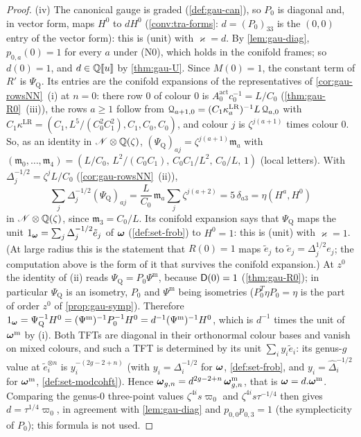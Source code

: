 \begin{proof}
(iv) The canonical gauge is graded (\cref{def:gau-can}), so $P_0$ is diagonal and, in vector form, maps $H^0$ to $dH^0$ (\cref{conv:tra-forms}: $d=(P_0)_{33}$ is the $(0,0)$ entry of the vector form): this is (unit) with $\varkappa=d$. By \cref{lem:gau-diag}, $p_{0,a}(0)=1$ for every $a$ under (N0), which holds in the conifold frames; so $d(0)=1$, and $d\in\mathbb{Q}[\![ u ]\!]$ by \cref{thm:gau-U}. Since $M(0)=1$, the constant term of $R'$ is $\Psi_{\mathrm Q}$. Its entries are the conifold expansions of the representatives of \cref{cor:gau-rowsNN}~(i) at $n=0$: there row $0$ of colour $0$ is $A^{\mathrm{act}}_0c_0^{-1}=L/C_0$ (\cref{thm:gau-R0}~(iii)), the rows $a\geq1$ follow from $\mathcal{Q}_{a+1,0}=(C_1\kappa^{\mathrm{LR}}_a)^{-1}L\,\mathcal{Q}_{a,0}$ with $C_1\kappa^{\mathrm{LR}}=(C_1,L^5/(C_0^2C_1^2),C_1,C_0,C_0)$, and colour $j$ is $\zeta^{j(a+1)}$ times colour $0$. So, as an identity in $\mathscr{N}\otimes\mathbb{Q}(\zeta)$, $(\Psi_{\mathrm Q})_{aj}=\zeta^{j(a+1)}\mathfrak m_a$ with $(\mathfrak m_0,\dots,\mathfrak m_4)=(L/C_0,\,L^2/(C_0C_1),\,C_0C_1/L^2,\,C_0/L,\,1)$ (local letters). With $\Delta_j^{-1/2}=\zeta^jL/C_0$ (\cref{cor:gau-rowsNN}~(ii)),
\[
\textstyle\sum_j\Delta_j^{-1/2}(\Psi_{\mathrm Q})_{aj}=\frac L{C_0}\,\mathfrak m_a\sum_j\zeta^{j(a+2)}=5\,\delta_{a3}=\eta(H^a,H^0)
\]
in $\mathscr{N}\otimes\mathbb{Q}(\zeta)$, since $\mathfrak m_3=C_0/L$. Its conifold expansion says that $\Psi_{\mathrm Q}$ maps the unit $1_{\boldsymbol{\omega}}=\sum_j\Delta_j^{-1/2}\tilde e_j$ of $\boldsymbol{\omega}$ (\cref{def:set-frob}) to $H^0=1$: this is (unit) with $\varkappa=1$. (At large radius this is the statement that $R(0)=1$ maps $\tilde e_j$ to $\tilde e_j=\Delta_j^{1/2}e_j$; the computation above is the form of it that survives the conifold expansion.) At $z^0$ the identity of (ii) reads $\Psi_{\mathrm Q}=P_0\Psi^{\mathrm m}$, because $\mathsf{D}(0)=1$ (\cref{thm:gau-R0}); in particular $\Psi_{\mathrm Q}$ is an isometry, $P_0$ and $\Psi^{\mathrm m}$ being isometries ($P_0^T\eta P_0=\eta$ is the part of order $z^0$ of \cref{prop:gau-symp}). Therefore $1_{\boldsymbol{\omega}}=\Psi_{\mathrm Q}^{-1}H^0=(\Psi^{\mathrm m})^{-1}P_0^{-1}H^0=d^{-1}(\Psi^{\mathrm m})^{-1}H^0$, which is $d^{-1}$ times the unit of $\boldsymbol{\omega}^{\mathrm m}$ by (i). Both TFTs are diagonal in their orthonormal colour bases and vanish on mixed colours, and such a TFT is determined by its unit $\sum_iy_i\tilde e_i$: its genus-$g$ value at $\tilde e_i^{\otimes n}$ is $y_i^{-(2g-2+n)}$ (with $y_i=\Delta_i^{-1/2}$ for $\boldsymbol{\omega}$, \cref{def:set-frob}, and $y_i=\hat\Delta_i^{-1/2}$ for $\boldsymbol{\omega}^{\mathrm m}$, \cref{def:set-modcohft}). Hence $\boldsymbol{\omega}_{g,n}=d^{2g-2+n}\,\boldsymbol{\omega}^{\mathrm m}_{g,n}$, that is $\boldsymbol{\omega}=d.\boldsymbol{\omega}^{\mathrm m}$. Comparing the genus-$0$ three-point values $\zeta^{4i}s\varpi_0$ and $\zeta^{4i}s\tau^{-1/4}$ then gives $d=\tau^{1/4}\varpi_0$, in agreement with \cref{lem:gau-diag} and $p_{0,0}p_{0,3}=1$ (the symplecticity of $P_0$); this formula is not used.
\end{proof}

